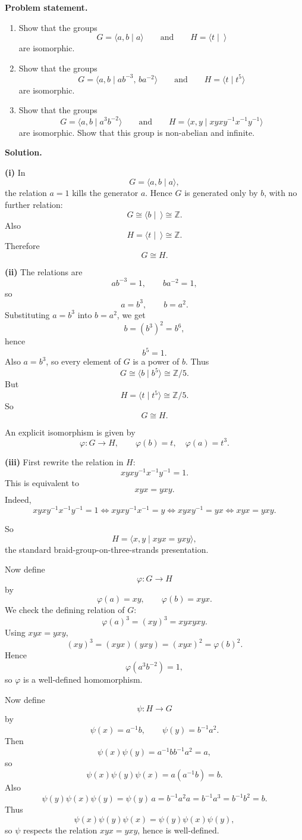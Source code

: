 \documentclass[12pt,a4paper]{article}
\theoremstyle{notespace}
\begin{document}
\textbf{Problem statement.}
\begin{enumerate}
	\item[(i)] Show that the groups
	\[
	G=\langle a,b\mid a\rangle
	\qquad\text{and}\qquad
	H=\langle t\mid \ \rangle
	\]
	are isomorphic.
	
	\item[(ii)] Show that the groups
	\[
	G=\langle a,b\mid ab^{-3},\,ba^{-2}\rangle
	\qquad\text{and}\qquad
	H=\langle t\mid t^5\rangle
	\]
	are isomorphic.
	
	\item[(iii)] Show that the groups
	\[
	G=\langle a,b\mid a^3b^{-2}\rangle
	\qquad\text{and}\qquad
	H=\langle x,y\mid xyxy^{-1}x^{-1}y^{-1}\rangle
	\]
	are isomorphic. Show that this group is non-abelian and infinite.
\end{enumerate}

\textbf{Solution.}

\textbf{(i)}
In
\[
G=\langle a,b\mid a\rangle,
\]
the relation \(a=1\) kills the generator \(a\). Hence \(G\) is generated only by \(b\), with no further relation:
\[
G\cong \langle b\mid \ \rangle \cong \mathbb{Z}.
\]
Also
\[
H=\langle t\mid \ \rangle \cong \mathbb{Z}.
\]
Therefore
\[
G\cong H.
\]

\textbf{(ii)}
The relations are
\[
ab^{-3}=1,\qquad ba^{-2}=1,
\]
so
\[
a=b^3,\qquad b=a^2.
\]
Substituting \(a=b^3\) into \(b=a^2\), we get
\[
b=(b^3)^2=b^6,
\]
hence
\[
b^5=1.
\]
Also \(a=b^3\), so every element of \(G\) is a power of \(b\). Thus
\[
G\cong \langle b\mid b^5\rangle \cong \mathbb{Z}/5.
\]
But
\[
H=\langle t\mid t^5\rangle \cong \mathbb{Z}/5.
\]
So
\[
G\cong H.
\]

An explicit isomorphism is given by
\[
\varphi:G\to H,\qquad \varphi(b)=t,\quad \varphi(a)=t^3.
\]

\textbf{(iii)}
First rewrite the relation in \(H\):
\[
xyxy^{-1}x^{-1}y^{-1}=1.
\]
This is equivalent to
\[
xyx=yxy.
\]
Indeed,
\[
xyxy^{-1}x^{-1}y^{-1}=1
\iff xyxy^{-1}x^{-1}=y
\iff xyxy^{-1}=yx
\iff xyx=yxy.
\]

So
\[
H=\langle x,y\mid xyx=yxy\rangle,
\]
the standard braid-group-on-three-strands presentation.

Now define
\[
\varphi:G\to H
\]
by
\[
\varphi(a)=xy,\qquad \varphi(b)=xyx.
\]
We check the defining relation of \(G\):
\[
\varphi(a)^3=(xy)^3=xyxyxy.
\]
Using \(xyx=yxy\),
\[
(xy)^3=(xyx)(yxy)=(xyx)^2=\varphi(b)^2.
\]
Hence
\[
\varphi(a^3b^{-2})=1,
\]
so \(\varphi\) is a well-defined homomorphism.

Now define
\[
\psi:H\to G
\]
by
\[
\psi(x)=a^{-1}b,\qquad \psi(y)=b^{-1}a^2.
\]
Then
\[
\psi(x)\psi(y)=a^{-1}bb^{-1}a^2=a,
\]
so
\[
\psi(x)\psi(y)\psi(x)=a(a^{-1}b)=b.
\]
Also
\[
\psi(y)\psi(x)\psi(y)=\psi(y)\,a
= b^{-1}a^2a
= b^{-1}a^3
= b^{-1}b^2
= b.
\]
Thus
\[
\psi(x)\psi(y)\psi(x)=\psi(y)\psi(x)\psi(y),
\]
so \(\psi\) respects the relation \(xyx=yxy\), hence is well-defined.
\end{document}

